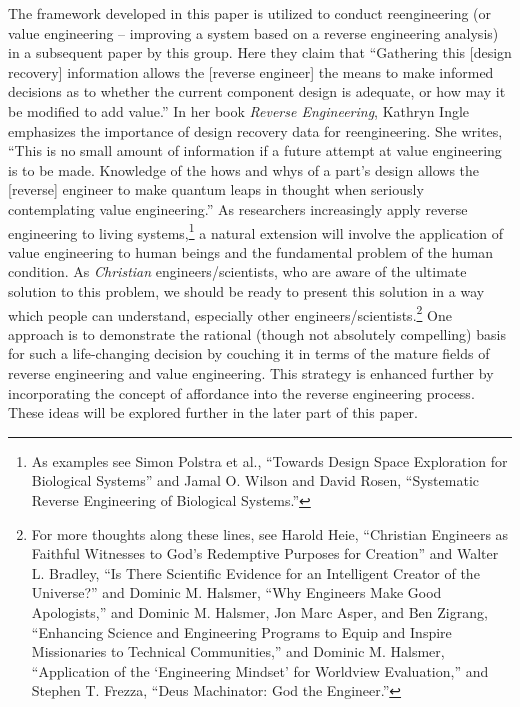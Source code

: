 The framework developed in this paper is utilized to conduct
reengineering (or value engineering – improving a system based on a
reverse engineering analysis) in a subsequent paper by this group. Here
they claim that “Gathering this [design recovery] information allows
the [reverse engineer] the means to make informed decisions as to
whether the current component design is adequate, or how may it be
modified to add value.”\citep[][pg. 166]{urbanicelmaraghy2009b} In her 
book \textit{Reverse Engineering}, Kathryn Ingle emphasizes the importance of design
recovery data for reengineering. She writes, “This is no small amount
of information if a future attempt at value engineering is to be made.
Knowledge of the hows and whys of a part’s design allows the [reverse]
engineer to make quantum leaps in thought when seriously contemplating
value engineering.”\citep[][pgs. 65--66]{ingle1994} As researchers increasingly
apply reverse engineering to living systems,\footnote{
As examples see Simon Polstra et al., “Towards
Design Space Exploration for Biological Systems”\citep{polstraetal2008}
and Jamal O. Wilson and David Rosen,
“Systematic Reverse Engineering of Biological Systems.”\citep{wilsonrosen2007}
} a
natural extension will involve the application of value engineering to
human beings and the fundamental problem of the human condition. As
\textit{Christian} engineers/scientists, who are aware of the ultimate
solution to this problem, we should be ready to present this solution
in a way which people can understand, especially other
engineers/scientists.\footnote{
For more thoughts along these lines, see Harold
Heie, “Christian Engineers as Faithful Witnesses to God’s Redemptive
Purposes for Creation”\citep{heie1999}
and Walter L. Bradley,
“Is There Scientific Evidence for an Intelligent Creator of the
Universe?”\citep{bradley2003}
and Dominic M. Halsmer, “Why Engineers Make Good Apologists,”\citep{halsmer2007}
 and Dominic M. Halsmer, Jon Marc Asper, and Ben Zigrang,
“Enhancing Science and Engineering Programs to Equip and Inspire
Missionaries to Technical Communities,”\citep{halsmeretal2011}
and Dominic M. Halsmer,
“Application of the ‘Engineering Mindset’ for Worldview Evaluation,”\citep{halsmer2009}
and Stephen T. Frezza, “Deus Machinator: God the Engineer.”\citep{frezza2009}
} One approach is to
demonstrate the rational (though not absolutely compelling) basis for
such a life-changing decision by couching it in terms of the mature
fields of reverse engineering and value engineering. This strategy is
enhanced further by incorporating the concept of affordance into the
reverse engineering process. These ideas will be explored further in
the later part of this paper.

